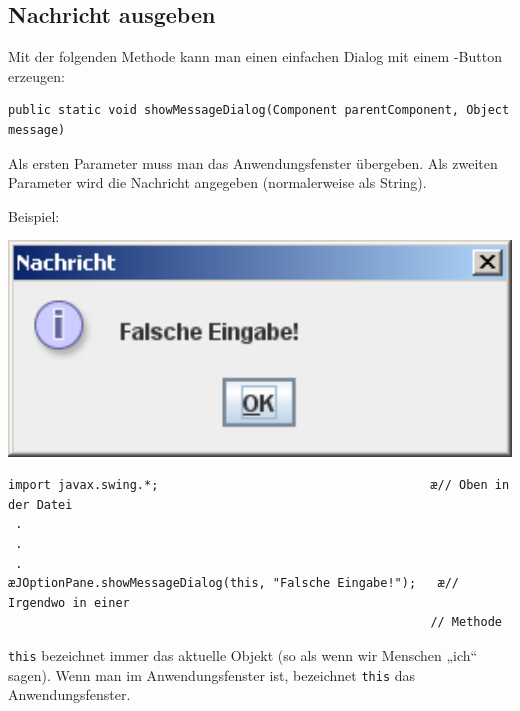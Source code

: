 \subsection{Nachricht ausgeben}

Mit der folgenden Methode kann man einen einfachen Dialog mit einem
-Button erzeugen:

\begin{lstlisting}
public static void showMessageDialog(Component parentComponent, Object message)
\end{lstlisting}

\begin{minipage}{0.6\textwidth}
Als ersten Parameter muss man das Anwendungsfenster übergeben. Als zweiten
Parameter wird die Nachricht angegeben (normalerweise als String).

\vspace{5mm}

Beispiel:
\end{minipage}\hfill
\begin{minipage}{0.30\textwidth}
\centering
\includegraphics[width=1.0\textwidth]{./inf/SEKII/07_Java_Dialoge/MessageDialog.png}
\end{minipage}

\begin{lstlisting}
import javax.swing.*;                                      æ// Oben in der Datei 
 .
 .
 .
æJOptionPane.showMessageDialog(this, "Falsche Eingabe!");   æ// Irgendwo in einer 
                                                           // Methode
\end{lstlisting}

\begin{center}
\begin{minipage}{1.0\textwidth}
\begin{framed}
\verb|this| bezeichnet immer das aktuelle Objekt (so als wenn wir
Menschen „ich“ sagen). Wenn man im Anwendungsfenster
ist, bezeichnet \verb|this| das Anwendungsfenster.
\end{framed}
\end{minipage}
\end{center}

